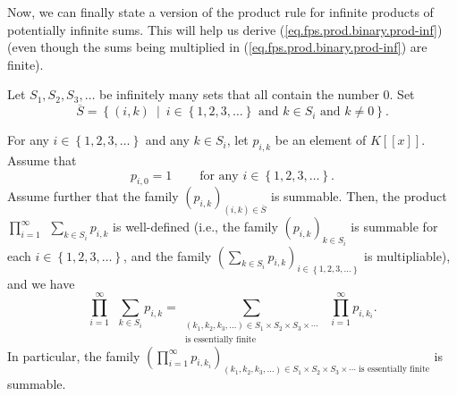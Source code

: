Now, we can finally state a version of the product rule for infinite products
of potentially infinite sums. This will help us derive
(\ref{eq.fps.prod.binary.prod-inf}) (even though the sums being multiplied in
(\ref{eq.fps.prod.binary.prod-inf}) are finite).

\begin{proposition}
\label{prop.fps.prodrule-inf-infN}Let $S_{1},S_{2},S_{3},\ldots$ be infinitely
many sets that all contain the number $0$. Set%
\[
\overline{S}=\left\{  \left(  i,k\right)  \ \mid\ i\in\left\{  1,2,3,\ldots
\right\}  \text{ and }k\in S_{i}\text{ and }k\neq0\right\}  .
\]


For any $i\in\left\{  1,2,3,\ldots\right\}  $ and any $k\in S_{i}$, let
$p_{i,k}$ be an element of $K\left[  \left[  x\right]  \right]  $. Assume
that
\begin{equation}
p_{i,0}=1\ \ \ \ \ \ \ \ \ \ \text{for any }i\in\left\{  1,2,3,\ldots\right\}
. \label{eq.prop.fps.prodrule-inf-infN.pi0=1}%
\end{equation}
Assume further that the family $\left(  p_{i,k}\right)  _{\left(  i,k\right)
\in\overline{S}}$ is summable. Then, the product $\prod_{i=1}^{\infty}%
\ \ \sum_{k\in S_{i}}p_{i,k}$ is well-defined (i.e., the family $\left(
p_{i,k}\right)  _{k\in S_{i}}$ is summable for each $i\in\left\{
1,2,3,\ldots\right\}  $, and the family $\left(  \sum_{k\in S_{i}}%
p_{i,k}\right)  _{i\in\left\{  1,2,3,\ldots\right\}  }$ is multipliable), and
we have%
\begin{equation}
\prod_{i=1}^{\infty}\ \ \sum_{k\in S_{i}}p_{i,k}=\sum_{\substack{\left(
k_{1},k_{2},k_{3},\ldots\right)  \in S_{1}\times S_{2}\times S_{3}\times
\cdots\\\text{is essentially finite}}}\ \ \prod_{i=1}^{\infty}p_{i,k_{i}}.
\label{eq.prop.fps.prodrule-inf-infN.eq}%
\end{equation}
In particular, the family $\left(  \prod_{i=1}^{\infty}p_{i,k_{i}}\right)
_{\left(  k_{1},k_{2},k_{3},\ldots\right)  \in S_{1}\times S_{2}\times
S_{3}\times\cdots\text{ is essentially finite}}$ is summable.
\end{proposition}

